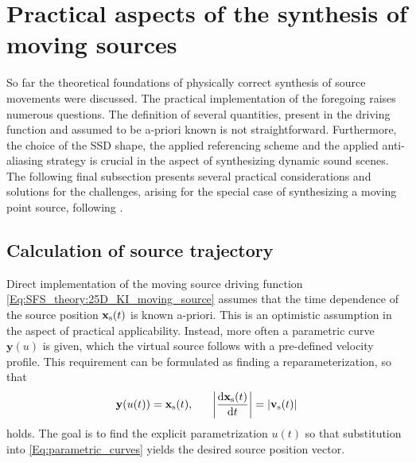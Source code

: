 \section{Practical aspects of the synthesis of moving sources}

So far the theoretical foundations of physically correct synthesis of source movements were discussed.
The practical implementation of the foregoing raises numerous questions.
The definition of several quantities, present in the driving function and assumed to be a-priori known is not straightforward.
Furthermore, the choice of the SSD shape, the applied referencing scheme and the applied anti-aliasing strategy is crucial in the aspect of synthesizing dynamic sound scenes.
The following final subsection presents several practical considerations and solutions for the challenges, arising for the special case of synthesizing a moving point source, following \cite{Firtha2018_daga_moving_source}.

\subsection{Calculation of source trajectory}
\label{Sec:Trajectory_calc}

Direct implementation of the moving source driving function \eqref{Eq:SFS_theory:25D_KI_moving_source} assumes that the time dependence of the source position $\mathbf{x}_{\mathrm{s}}(t)$ is known a-priori. 
This is an optimistic assumption in the aspect of practical applicability. 
Instead, more often a parametric curve $\mathbf{y}(u)$ is given, which the virtual source follows with a pre-defined velocity profile.
This requirement can be formulated as finding a reparameterization, so that 
\begin{equation}
\mathbf{y}(u(t)) = \mathbf{x}_{\mathrm{s}}(t), \hspace{6mm} \left| \frac{\mathrm{d} \mathbf{x}_{\mathrm{s}}(t)}{\mathrm{d} t} \right| = |\mathbf{v}_{\mathrm{s}}(t)| 
\label{Eq:parametric_curves}
\end{equation}
holds. 
The goal is to find the explicit parametrization $u(t)$ so that substitution into \eqref{Eq:parametric_curves} yields the desired source position vector.


